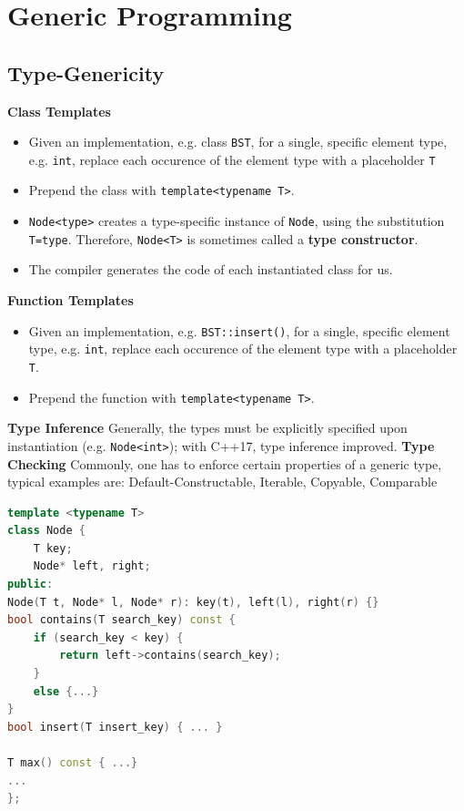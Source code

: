 \section{Generic Programming}
\vspace{-4pt}
\begin{sectionbox}
\subsection{Type-Genericity}
\textbf{Class Templates}\smallskip
\begin{itemize}
    \item Given an implementation, e.g. class \lstinline{BST}, for a single, specific element type, e.g. \lstinline{int}, replace each occurence of the element type with a placeholder \lstinline{T}
    \item Prepend the class with \lstinline{template<typename T>}.
    \item \lstinline{Node<type>} creates a type-specific instance of \lstinline{Node}, using the substitution \lstinline{T=type}. Therefore, \lstinline{Node<T>} is sometimes called a \textbf{type constructor}.
    \item The compiler generates the code of each instantiated class for us.
\end{itemize}
\textbf{Function Templates}\smallskip
\begin{itemize}
    \item Given an implementation, e.g. \lstinline{BST::insert()}, for a single, specific element type, e.g. \lstinline{int}, replace each occurence of the element type with a placeholder \lstinline{T}.
    \item Prepend the function with \lstinline{template<typename T>}.
\end{itemize}
\textbf{Type Inference}\smallskip
Generally, the types must be explicitly specified upon instantiation (e.g. \lstinline{Node<int>}); with C++17, type inference improved.
\textbf{Type Checking}\smallskip
Commonly, one has to enforce certain properties of a generic type, typical examples are: 
Default-Constructable, Iterable, Copyable, Comparable
\end{sectionbox}
\vspace{-4pt}
\begin{lstlisting}[language=C++]
template <typename T>
class Node { 
    T key;
    Node* left, right;
public:
Node(T t, Node* l, Node* r): key(t), left(l), right(r) {}
bool contains(T search_key) const {
    if (search_key < key) {
        return left->contains(search_key); 
    }
    else {...}
}
bool insert(T insert_key) { ... }

T max() const { ...}
...
};  
\end{lstlisting}
